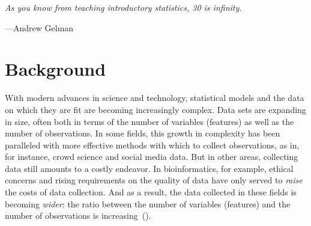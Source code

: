 

\epigraph{\itshape
  As you know from teaching introductory statistics, 30 is infinity.
}{
  ---Andrew Gelman
}

\section{Background}

With modern advances in science and technology, statistical models and the data on which they are fit are becoming increasingly complex. Data sets are expanding in size, often both in terms of the number of variables (features) as well as the number of observations. In some fields, this growth in complexity has been paralleled with more effective methods with which to collect observations, as in, for instance, crowd science and social media data. But in other areas, collecting data still amounts to a costly endeavor. In bioinformatics, for example, ethical concerns and rising requirements on the quality of data have only served to \emph{raise} the costs of data collection. And as a result, the data collected in these fields is becoming \emph{wider}: the ratio between the number of variables (features) and the number of observations is increasing~().

